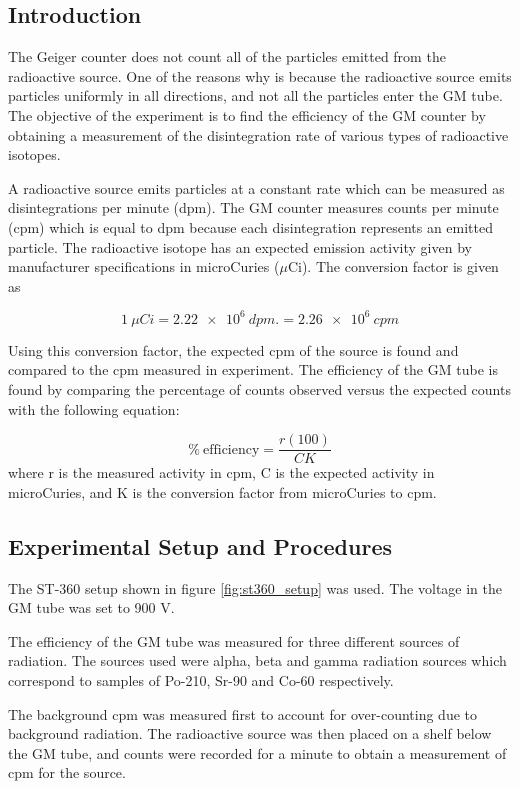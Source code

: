 \documentclass[reprint,amsmath,amssymb,aps,prl]{revtex4-2}
\begin{document}
\subsection{Introduction}
The Geiger counter does not count all of the particles emitted from the radioactive source. One of the reasons why is because the radioactive source emits particles uniformly in all directions, and not all the particles enter the GM tube. 
The objective of the experiment is to find the efficiency of the GM counter by obtaining a measurement of the disintegration rate of various types of radioactive isotopes. 

A radioactive source emits particles at a constant rate which can be measured as disintegrations per minute (dpm). The GM counter measures counts per minute (cpm) which is equal to dpm because each disintegration represents an emitted particle. The radioactive isotope has an expected emission activity given by manufacturer specifications in microCuries ($\mu$Ci). The conversion factor is given as

\begin{equation*}
    1 \ \mu Ci =  \SI{2.22e6}{dpm.} = \SI{2.26e6}{cpm}
\end{equation*}
    
Using this conversion factor, the expected cpm of the source is found and compared to the cpm measured in experiment. The efficiency of the GM tube is found by comparing the percentage of counts observed versus the expected counts with the following equation:

\begin{equation} \label{lab5 percentage formula}
    \% \ \text{efficiency} = \frac{r(100)}{C K}
\end{equation}
where r is the measured activity in cpm, C is the expected activity in microCuries, and K is the conversion factor from microCuries to cpm.

 \subsection{Experimental Setup and Procedures}
The ST-360 setup shown in figure \ref{fig:st360_setup} was used. The voltage in the GM tube was set to 900 V. 

The efficiency of the GM tube was measured for three different sources of radiation. The sources used were alpha, beta and gamma radiation sources which correspond to samples of Po-210, Sr-90 and Co-60 respectively. 

The background cpm was measured first to account for over-counting due to background radiation. The radioactive source was then placed on a shelf below the GM tube, and counts were recorded for a minute to obtain a measurement of cpm for the source. 
\end{document}
